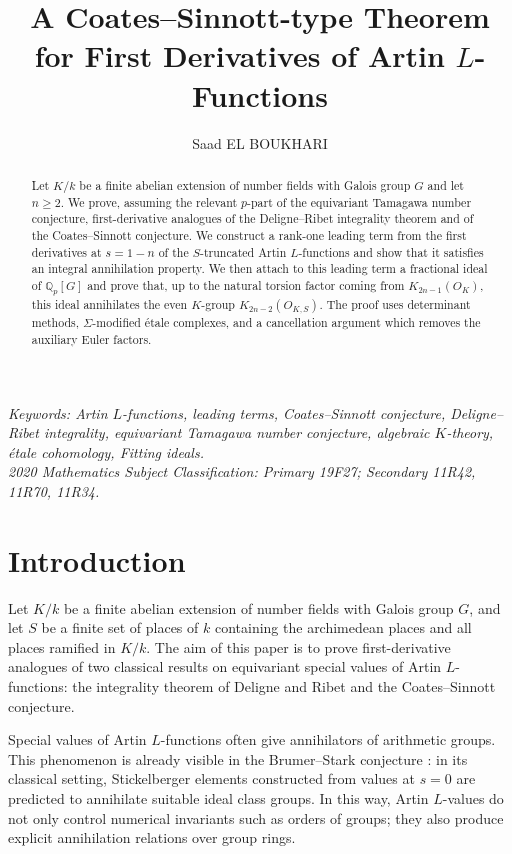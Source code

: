 \documentclass[a4paper,11pt]{article}
\date{}
\title{\textbf{A Coates--Sinnott-type Theorem for First Derivatives of Artin \(L\)-Functions}}
\author{Saad EL BOUKHARI}
\begin{document}
\maketitle
\date{}
\begin{abstract}
Let \(K/k\) be a finite abelian extension of number fields with Galois group \(G\) and let \(n\geq 2\). We prove, assuming the relevant \(p\)-part of the equivariant Tamagawa number conjecture, first-derivative analogues of the Deligne--Ribet integrality theorem and of the Coates--Sinnott conjecture. We construct a rank-one leading term from the first derivatives at \(s=1-n\) of the \(S\)-truncated Artin \(L\)-functions and show that it satisfies an integral annihilation property. We then attach to this leading term a fractional ideal of \(\mathbb Q_p[G]\) and prove that, up to the
natural torsion factor coming from \(K_{2n-1}(O_K)\), this ideal annihilates the even \(K\)-group \(K_{2n-2}(O_{K,S})\). The proof uses determinant methods, \(\Sigma\)-modified étale complexes, and a cancellation argument which removes
the auxiliary Euler factors.
\end{abstract}
\textit{Keywords: Artin \(L\)-functions, leading terms, Coates--Sinnott conjecture,
Deligne--Ribet integrality, equivariant Tamagawa number conjecture,
algebraic \(K\)-theory, étale cohomology, Fitting ideals.}\\
\textit{2020 Mathematics Subject Classification: Primary 19F27; Secondary 11R42, 11R70, 11R34.}
\section{Introduction}
Let \(K/k\) be a finite abelian extension of number fields with Galois group
\(G\), and let \(S\) be a finite set of places of \(k\) containing the
archimedean places and all places ramified in \(K/k\). The aim of this paper is
to prove first-derivative analogues of two classical results on equivariant
special values of Artin \(L\)-functions: the integrality theorem of Deligne and
Ribet and the Coates--Sinnott conjecture.

\medskip

\noindent Special values of Artin \(L\)-functions often give annihilators of
arithmetic groups. This phenomenon is already visible in the Brumer--Stark
conjecture \cite{BrumerStark}: in its classical setting, Stickelberger elements
constructed from values at \(s=0\) are predicted to annihilate suitable ideal
class groups. In this way, Artin \(L\)-values do not only control numerical
invariants such as orders of groups; they also produce explicit annihilation
relations over group rings.
\end{document}
